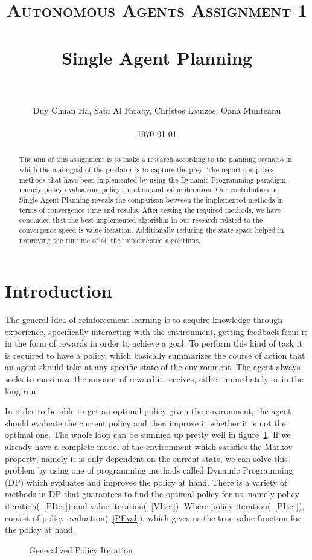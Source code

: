 \documentclass[paper=a4, fontsize=11pt]{scrartcl}
\title{
		\usefont{OT1}{bch}{b}{n}
		\normalfont \normalsize \textsc{Autonomous Agents Assignment 1} \\ [25pt]
		\horrule{0.5pt} \\[0.4cm]
		\huge Single Agent Planning \\
		\horrule{2pt} \\[0.5cm]
}
\author{
        Duy Chuan Ha, Said Al Faraby, Christos Louizos, Oana Munteanu %
        \\
        \\
        \today
}
\date{}
\numberwithin{equation}{section}		%
\numberwithin{figure}{section}			%
\numberwithin{table}{section}				%
\begin{document}
\maketitle
\bigskip
\bigskip
\bigskip
\bigskip
\begin{abstract}
The aim of this assignment is to make a research according to the planning scenario in which the main goal of the predator is to capture the prey. The report comprises methods that have been implemented by using the Dynamic Programming paradigm, namely policy evaluation, policy iteration and value iteration. Our contribution on Single Agent Planning reveals the comparison between the implemented methods in terms of convergence time and results. After testing the required methods, we have concluded that the best implemented algorithm in our research related to the convergence speed is value iteration. Additionally reducing the state space helped in improving the runtime of all the implemented algorithms.
\end{abstract}

\section{Introduction}
The general idea of reinforcement learning is to acquire knowledge through experience, specifically interacting with the environment, getting feedback from it in the form of rewards in order to achieve a goal. To perform this kind of task it is required to have a policy, which basically summarizes the course of action that an agent should take at any specific state of the environment. The agent always seeks to maximize the amount of reward it receives, either immediately or in the long run. 

In order to be able to get an optimal policy given the environment, the agent should evaluate the current policy and then improve it whether it is not the optimal one. The whole loop can be summed up pretty well in figure~\ref{GPI}. If we already have a complete model of the environment which satisfies the Markov property, namely it is only dependent on the current state, we can solve this problem by using one of programming methods called Dynamic Programming (DP) which evaluates and improves the policy at hand. There is a variety of methods in DP that guarantees to find the optimal policy for us, namely policy iteration(~\ref{PIter}) and value iteration(~\ref{VIter}). Where policy iteration(~\ref{PIter}), consist of policy evaluation(~\ref{PEval}), which gives us the true value function for the policy at hand.
\begin{figure}[H] \centering
{}
\caption{Generalized Policy Iteration\cite{suttonBarto}} 
\label{GPI}
\end{figure}
\end{document}
